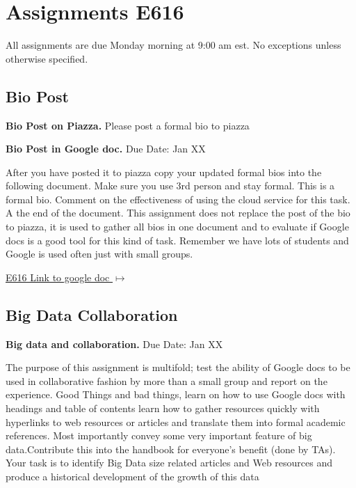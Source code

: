 \begin{exercise}
\begin{exercise}
\end{exercise}


\section{Assignments E616} \label{s:e616-assignments}

All assignments are due Monday morning at 9:00 am est. No exceptions unless otherwise specified.

\subsection{Bio Post}

\begin{exercise}\label{a:e616-bio-piazza}
{\bf Bio Post on Piazza.} Please post a formal bio to piazza
\end{exercise}

\begin{exercise} \label{a:e616-bio-googledocs}

 {\bf Bio Post in Google doc.} Due Date: Jan XX
 
 After you have posted it to piazza copy your updated formal bios into the following document. Make sure you use 3rd person and stay formal. This is a formal bio. Comment on the effectiveness of using the cloud service for this task. A the end of the document. This assignment does not replace the post of the bio to piazza, it is used to gather all bios in one document and to evaluate if Google docs is a good tool for this kind of task. Remember we have lots of students and Google is used often just with small groups.
 
 \smallskip

 {\hfill \href{https://docs.google.com/document/d/1ejzlKYqC3dLac8WXVpcPQsJh1j4BDqRxxgGg1cFQbeQ/edit?usp=sharing} {E616 Link to google doc $\mapsto$}}

 \end{exercise}

\subsection{Big Data Collaboration}

\begin{exercise} \label{a:e616-big-data-and-collaboration}

{\bf Big data and collaboration.} Due Date: Jan XX

The purpose of this assignment is multifold; test the ability of Google docs to be used in collaborative fashion by more than a small group and report on the experience. Good Things and bad things, learn on how to use Google docs with headings and table of contents learn how to gather resources quickly with hyperlinks to web resources or articles and translate them into formal academic references. Most importantly convey some very important feature of big data.Contribute this into the handbook for everyone's benefit (done by TAs). Your task is to identify Big Data size related articles and Web resources and produce a historical development of the growth of this data


\end{exercise}
\end{exercise}
